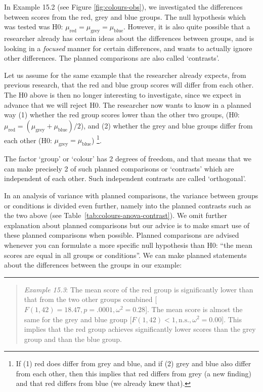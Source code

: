 \documentclass[
]{book}
\begin{document}
In Example 15.2 (see
Figure \ref{fig:colours-obs}), we investigated the differences between
scores from the red, grey and blue groups. The null hypothesis which was tested
was H0:
\(\mu_\textrm{red} = \mu_\textrm{grey} = \mu_\textrm{blue}\).
However, it is also quite possible that a researcher already has
certain ideas about the differences between groups, and is looking in a
\emph{focused} manner for certain differences, and wants to actually ignore other
differences. The planned comparisons are also called `contrasts'.

Let us assume for the same example that the researcher already expects,
from previous research, that the red and blue group scores will differ from
each other. The H0 above is then no longer interesting to investigate, since
we expect in advance that we will reject H0. The researcher now wants to know
in a planned way (1) whether the red group scores lower than the other two groups,
(H0: \(\mu_\textrm{red} = (\mu_\textrm{grey}+\mu_\textrm{blue})/2\)),
and (2)
whether the grey and blue groups differ from each other (H0:
\(\mu_\textrm{grey} = \mu_\textrm{blue}\))
\footnote{If (1) red does differ from grey and blue, and if (2) grey and blue
  also differ from each other, then this implies that red differs from grey (a new
  finding) and that red differs from blue (we already knew that).}.

The factor `group' or `colour' has 2 degrees of freedom, and that means that we
can make precisely 2 of such planned comparisons or `contrasts' which are
independent of each other. Such independent contrasts
are called `orthogonal'.

In an analysis of variance with planned comparisons, the variance between
groups or conditions is divided even further, namely into the planned
contrasts such as the two above (see
Table~\ref{tab:colours-anova-contrast}). We omit further explanation
about planned comparisons but our advice is to make
smart use of these planned comparisons when possible. Planned comparisons are advised whenever
you can formulate a more
specific null hypothesis than H0: ``the mean scores are equal
in all groups or conditions''. We can make planned statements
about the differences between the groups in our example:

\begin{center}\rule{0.5\linewidth}{0.5pt}\end{center}

\begin{quote}
\emph{Example 15.3}:
The mean score of the red
group is significantly lower than that from the two other groups combined
{[}\(F(1,42)=18.47, p=.0001, \omega^2=0.28\){]}. The mean score is
almost the same for the grey and blue group
{[}\(F(1,42)<1, \textrm{n.s.}, \omega^2=0.00\){]}.
This implies that the red group achieves significantly lower scores than the
grey group and than the blue group.
\end{quote}
\end{document}
